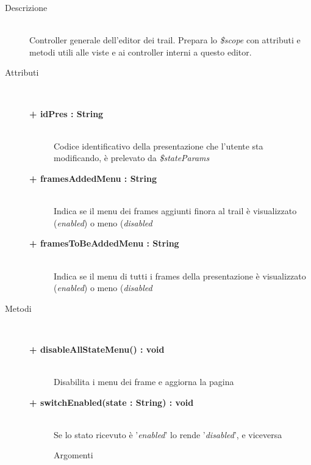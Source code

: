 \begin{description}
\item[Descrizione] \hfill \\
	Controller generale dell'editor dei trail. Prepara lo \textit{\$scope} con attributi e metodi utili alle viste e ai controller interni a questo editor.
	
	
\item[Attributi] \hfill \\
	\begin{description}
		\item[\textbf{+ idPres : String			}] \hfill \\
			Codice identificativo della presentazione che l'utente sta modificando, è prelevato da \textit{\$stateParams}
		\item[\textbf{+ framesAddedMenu	: String		}] \hfill \\
			Indica se il menu dei frames aggiunti finora al trail è visualizzato (\textit{enabled}) o meno (\textit{disabled}
		\item[\textbf{+ framesToBeAddedMenu	: String		}] \hfill \\
			Indica se il menu di tutti i frames della presentazione è visualizzato (\textit{enabled}) o meno (\textit{disabled}
	\end{description}
	
	
\item[Metodi] \hfill \\

	\begin{description}
		\item[\textbf{\color{blue}+ disableAllStateMenu() : void			}] \hfill \\
			Disabilita i menu dei frame e aggiorna la pagina

	\end{description}
	
	\begin{description}
		\item[\textbf{\color{blue}+ switchEnabled(state : String) : void			}] \hfill \\
			Se lo stato ricevuto è '\textit{enabled}' lo rende '\textit{disabled}', e viceversa
			
		\begin{description}
			\item[Argomenti] \hfill \\
				\begin{itemize}
				

\end{itemize}
\end{description}
\end{description}
\end{description}
